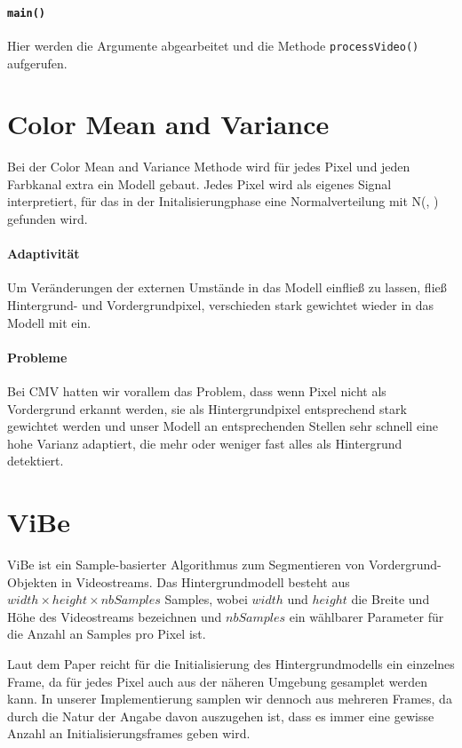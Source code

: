 \documentclass[]{scrartcl}
\begin{document}
\paragraph{\texttt{main()}} Hier werden die Argumente abgearbeitet und die Methode \texttt{processVideo()} aufgerufen.

\section{Color Mean and Variance}\label{sec:cmv}
Bei der Color Mean and Variance Methode wird für jedes Pixel und jeden Farbkanal extra ein Modell gebaut. Jedes Pixel wird als eigenes Signal interpretiert, für das in der Initalisierungphase eine Normalverteilung mit N(\mu, \sigma) gefunden wird. 
\paragraph{Adaptivit\"at} 
Um Veränderungen der externen Umst\"ande in das Modell einflie\ss{} zu lassen, flie\ss{} Hintergrund- und Vordergrundpixel, verschieden stark gewichtet wieder in das Modell mit ein.
\paragraph{Probleme} 
Bei CMV hatten wir vorallem das Problem, dass wenn Pixel nicht als Vordergrund erkannt werden, sie als Hintergrundpixel entsprechend stark gewichtet werden und unser Modell an entsprechenden Stellen sehr schnell eine hohe Varianz adaptiert, die mehr oder weniger fast alles als Hintergrund detektiert.

\section{ViBe}\label{sec:vibe}
ViBe ist ein Sample-basierter Algorithmus zum Segmentieren von Vordergrund-Objekten in Videostreams. Das Hintergrundmodell besteht aus $width \times height \times nbSamples$ Samples, wobei $width$ und $height$ die Breite und H\"ohe des Videostreams bezeichnen und $nbSamples$ ein w\"ahlbarer Parameter f\"ur die Anzahl an Samples pro Pixel ist. 

Laut dem Paper reicht f\"ur die Initialisierung des Hintergrundmodells ein einzelnes Frame, da f\"ur jedes Pixel auch aus der n\"aheren Umgebung gesamplet werden kann. In unserer Implementierung samplen wir dennoch aus mehreren Frames, da durch die Natur der Angabe davon auszugehen ist, dass es immer eine gewisse Anzahl an Initialisierungsframes geben wird. 
\end{document}
